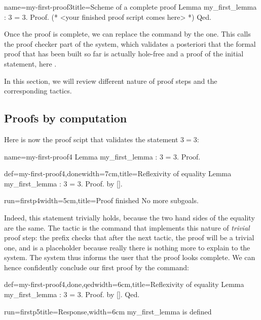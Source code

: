 \begin{coq}{name=my-first-proof3}{title=Scheme of a complete proof}
Lemma my_first_lemma : 3 = 3.
Proof.
(* <your finished proof script comes here> *)
Qed.
\end{coq}

Once the proof is complete, we can replace the  command by
the  one. This calls the proof checker part of  the \Coq{}
system, which validates a posteriori that the formal proof that has
been built so far is actually hole-free and a proof of the initial
statement, here .

In this section, we will review different nature of proof steps and
the corresponding tactics.

\subsection{Proofs by computation}\label{ssec:proofcomp}

Here is now the proof scipt that validates the statement $3 = 3$:

\begin{coqdef}{name=my-first-proof4}
Lemma my_first_lemma : 3 = 3.
Proof.
\end{coqdef}
\begin{coq}{def=my-first-proof4,done}{width=7cm,title=Reflexivity of equality}
Lemma my_first_lemma : 3 = 3.
Proof. by [].
\end{coq}
\begin{coqout}{run=firstp4}{width=5cm,title=Proof finished}
No more subgoals.
$~$
\end{coqout}

Indeed, this statement trivially holds, because the two hand sides of
the equality are the same. The tactic  is the command that
implements this nature of \emph{trivial} proof step: the  prefix
checks that after the next tactic, the proof will be a trivial
one, and \C{[]} is a placeholder because really there is nothing more
to explain to the system. The system thus informs the user
that the proof looks complete. We can hence confidently conclude our
first proof by the  command:

\begin{coq}{def=my-first-proof4,done,qed}{width=6cm,title=Reflexivity of equality}
Lemma my_first_lemma : 3 = 3.
Proof. by []. Qed.
\end{coq}
\begin{coqout}{run=firstp5}{title=Response,width=6cm}
my_first_lemma is defined
\end{coqout}

